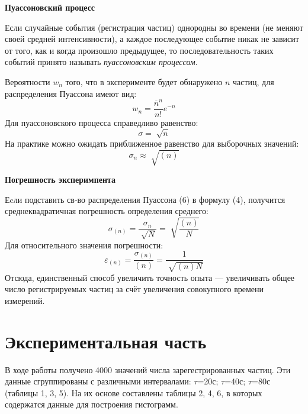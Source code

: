\documentclass{article}
\begin{document}
\noindent
\textbf{Пуассоновский процесс}

\noindent
Если случайные события (регистрация частиц) однородны во времени
(не меняют своей средней интенсивности), а каждое последующее событие
никак не зависит от того, как и когда произошло предыдущее, то последовательность таких событий принято называть \textit{пуассоновским процессом}. 

\noindent
Вероятности $w_n$ того, что в эксперименте будет обнаружено $n$ частиц, для распределения Пуассона имеют вид:
\begin{equation}\label{нср}
w_n=\frac{\overline{n}^{n}}{n!}e^{-n}
\end{equation}
Для пуассоновского процесса справедливо равенство:
\begin{equation}\label{нср}
\sigma=\sqrt[]{\overline{n}}
\end{equation}
На практике можно ожидать приближенное равенство для выборочных значений:
\begin{equation}\label{нср}
\sigma_n\approx\sqrt[]{(n)}
\end{equation}

\noindent
\textbf{Погрешность эксперимпента}

\noindent
Еcли подставить св-во распределения Пуассона (6) в формулу (4), получится среднеквадратичная погрешность определения среднего:  
\begin{equation}\label{нср}
\sigma_{(n)}=\frac{\sigma_{n}}{\sqrt[]{N}}=\sqrt[]{\frac{(n)}{N}}
\end{equation}
Для относительного значения погрешности:
\begin{equation}\label{нср}
\varepsilon_{(n)}=\frac{\sigma_{(n)}}{(n)}={\frac{1}{\sqrt[]{(n)N}}} 
\end{equation} 
Отсюда, единственный способ увеличить точность опыта — увеличивать общее число регистрируемых частиц за счёт увеличения совокупного времени измерений.

\section*{Экспериментальная часть}
В ходе работы получено 4000 значений числа зарегестрированных частиц. Эти данные сгруппированы с различными интервалами: $\tau$=20с; $\tau$=40с; $\tau$=80с (таблицы 1, 3, 5). На их основе составлены таблицы 2, 4, 6, в которых содержатся данные для построения гистограмм.
\end{document}
